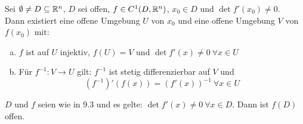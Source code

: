 \documentclass[a4paper,oneside,DIV15,BCOR12mm,chapterprefix=true,headings=onelinechapter]{scrbook}
\begin{document}
\begin{satz}
    Sei $\emptyset \ne D \subseteq \mathbb{R} ^n$, $D$ sei offen, 
    $f\in C^1(D, \mathbb{R}^n)$, $x_0\in D$ und $\det f'(x_0) \ne 0$.\\
    Dann existiert eine offene Umgebung $U$ von $x_0$ und eine offene
    Umgebung $V$ von $f(x_0)$ mit:
    \begin{enumerate}[(a)]
        \item $f$ ist auf $U$ injektiv, $f(U)=V$ und 
              $\det f'(x) \ne 0 \ \forall x\in U$
        \item Für $f^{-1}: V\to U$ gilt: $f^{-1}$ ist stetig 
              differenzierbar auf $V$ und 
              \[ (f^{-1})'(f(x)) = (f'(x))^{-1}\ \forall x\in U \]
    \end{enumerate}
\end{satz}

\begin{folgerung}
$D$ und $f$ seien wie in 9.3 und es gelte: $\det f'(x) \ne 0 \ \forall x\in D$. Dann ist $f(D)$ offen.
\end{folgerung}
\end{document}
